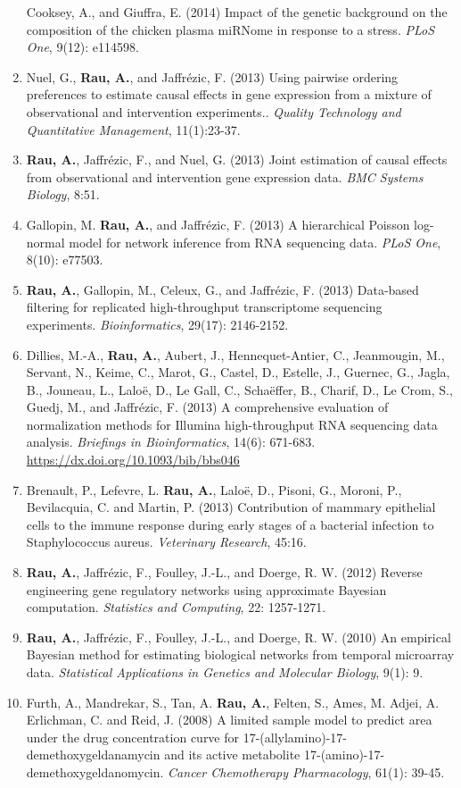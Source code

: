 \documentclass[11pt, a4paper]{awesome-cv}
\begin{document}
\begin{enumerate}
  Cooksey, A., and Giuffra, E. (2014) Impact of the genetic background
  on the composition of the chicken plasma miRNome in response to a
  stress. \emph{PLoS One}, 9(12): e114598.
\item
  Nuel, G., \textbf{Rau, A.}, and Jaffrézic, F. (2013) Using pairwise
  ordering preferences to estimate causal effects in gene expression
  from a mixture of observational and intervention experiments..
  \emph{Quality Technology and Quantitative Management}, 11(1):23-37.
\item
  \textbf{Rau, A.}, Jaffrézic, F., and Nuel, G. (2013) Joint estimation
  of causal effects from observational and intervention gene expression
  data. \emph{BMC Systems Biology}, 8:51.
\item
  Gallopin, M. \textbf{Rau, A.}, and Jaffrézic, F. (2013) A hierarchical
  Poisson log-normal model for network inference from RNA sequencing
  data. \emph{PLoS One}, 8(10): e77503.
\item
  \textbf{Rau, A.}, Gallopin, M., Celeux, G., and Jaffrézic, F. (2013)
  Data-based filtering for replicated high-throughput transcriptome
  sequencing experiments. \emph{Bioinformatics}, 29(17): 2146-2152.
\item
  Dillies, M.-A., \textbf{Rau, A.}, Aubert, J., Hennequet-Antier, C.,
  Jeanmougin, M., Servant, N., Keime, C., Marot, G., Castel, D.,
  Estelle, J., Guernec, G., Jagla, B., Jouneau, L., Laloë, D., Le Gall,
  C., Schaëffer, B., Charif, D., Le Crom, S., Guedj, M., and Jaffrézic,
  F. (2013) A comprehensive evaluation of normalization methods for
  Illumina high-throughput RNA sequencing data analysis. \emph{Briefings
  in Bioinformatics}, 14(6): 671-683.
  \url{https://dx.doi.org/10.1093/bib/bbs046}
\item
  Brenault, P., Lefevre, L. \textbf{Rau, A.}, Laloë, D., Pisoni, G.,
  Moroni, P., Bevilacquia, C. and Martin, P. (2013) Contribution of
  mammary epithelial cells to the immune response during early stages of
  a bacterial infection to Staphylococcus aureus. \emph{Veterinary
  Research}, 45:16.
\item
  \textbf{Rau, A.}, Jaffrézic, F., Foulley, J.-L., and Doerge, R. W.
  (2012) Reverse engineering gene regulatory networks using approximate
  Bayesian computation. \emph{Statistics and Computing}, 22: 1257-1271.
\item
  \textbf{Rau, A.}, Jaffrézic, F., Foulley, J.-L., and Doerge, R. W.
  (2010) An empirical Bayesian method for estimating biological networks
  from temporal microarray data. \emph{Statistical Applications in
  Genetics and Molecular Biology}, 9(1): 9.
\item
  Furth, A., Mandrekar, S., Tan, A. \textbf{Rau, A.}, Felten, S., Ames,
  M. Adjei, A. Erlichman, C. and Reid, J. (2008) A limited sample model
  to predict area under the drug concentration curve for
  17-(allylamino)-17-demethoxygeldanamycin and its active metabolite
  17-(amino)-17-demethoxygeldanomycin. \emph{Cancer Chemotherapy
  Pharmacology}, 61(1): 39-45.
\end{enumerate}
\end{document}
